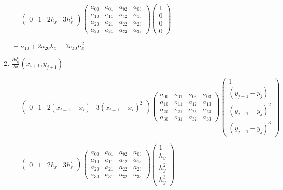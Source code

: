 \documentclass[11pt]{article}
\begin{document}
\begin{enumerate}[label=\textbf{\arabic*)}]
\begin{flushleft}
    $= \begin{pmatrix}
      0 & 1 & 2h_x & 3h_x^2
    \end{pmatrix}
    \begin{pmatrix}
      a_{00}  & a_{01} & a_{02} & a_{03} \\
      a_{10}  & a_{11} & a_{12} & a_{13} \\
      a_{20}  & a_{21} & a_{22} & a_{23} \\
      a_{30}  & a_{31} & a_{32} & a_{33}
    \end{pmatrix}
    \begin{pmatrix}
      1  \\
      0  \\
      0  \\
      0
    \end{pmatrix}$

    $= a_{10} + 2a_{20}h_x + 3a_{30}h_x^2$
    \end{flushleft}

    \item $\frac{\partial s_{ij}^C}{\partial x}(x_{i + 1}, y_{j + 1})$

    \begin{flushleft}
    $= \begin{pmatrix}
      0 & 1 & 2(x_{i + 1} - x_i) & 3(x_{i + 1} - x_i)^2
    \end{pmatrix}
    \begin{pmatrix}
      a_{00}  & a_{01} & a_{02} & a_{03} \\
      a_{10}  & a_{11} & a_{12} & a_{13} \\
      a_{20}  & a_{21} & a_{22} & a_{23} \\
      a_{30}  & a_{31} & a_{32} & a_{33}
    \end{pmatrix}
    \begin{pmatrix}
      1  \\
      (y_{j + 1} - y_j) \\
      (y_{j + 1} - y_j)^2  \\
      (y_{j + 1} - y_j)^3
    \end{pmatrix}$


    $= \begin{pmatrix}
      0 & 1 & 2h_x & 3h_x^2
    \end{pmatrix}
    \begin{pmatrix}
      a_{00}  & a_{01} & a_{02} & a_{03} \\
      a_{10}  & a_{11} & a_{12} & a_{13} \\
      a_{20}  & a_{21} & a_{22} & a_{23} \\
      a_{30}  & a_{31} & a_{32} & a_{33}
    \end{pmatrix}
    \begin{pmatrix}
      1  \\
      h_y  \\
      h_y^2  \\
      h_y^3
    \end{pmatrix}$


\end{flushleft}
\end{enumerate}
\end{document}
